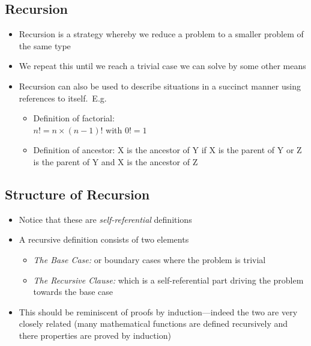 \begin{slide}
\section[-2]{Recursion}
\pb
\begin{itemize}
\item Recursion is a strategy whereby we reduce a problem to a smaller
  problem of the same type\pauseh
\item We repeat this until we reach a trivial case we can solve by
  some other means\pauseh
\item Recursion can also be used to describe situations in a succinct
  manner using references to itself.\pauseh\ E.g.
  \begin{minipage}{0.6\linewidth}
    \begin{itemize}\squeeze
    \item Definition of factorial:\\ $n! = n \times (n-1)!$ with $0!=1$\pauseh
    \item Definition of ancestor: X is the ancestor of Y if X is the
      parent of Y or Z is the parent of Y and X is the ancestor of Z\pauseh
    \end{itemize}    
  \end{minipage}\hfill
  \begin{minipage}{0.3\linewidth}
    \pause
  \end{minipage}
\end{itemize}

\end{slide}


\begin{slide}
\section{Structure of Recursion}

\begin{PauseHighLight}
  \begin{itemize}
  \item Notice that these are \textit{self-referential} definitions\pause
  \item A recursive definition consists of two elements\pause
    \begin{itemize}
    \item \emph{The Base Case:} or boundary cases where the problem is
      trivial\pause
    \item \emph{The Recursive Clause:} which is a self-referential part
      driving the problem towards the base case\pause
    \end{itemize}
  \item This should be reminiscent of proofs by induction\pause---indeed
    the two are very closely related (many mathematical functions are
    defined recursively and there properties are proved by
    induction)\pause
  \end{itemize}
\end{PauseHighLight}
\end{slide}

